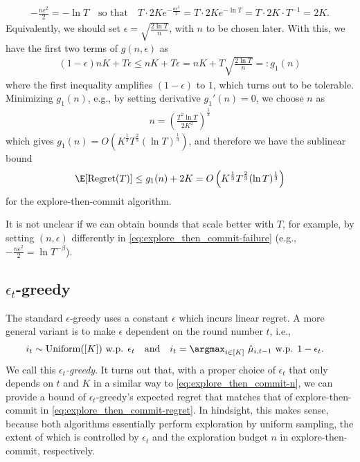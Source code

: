 \begin{align}
\label{eq:explore_then_commit-failure}
    -\tfrac{n \epsilon^2}{2} = -\ln T 
    \quad\text{so that}\quad T\cdot2K e^{-\frac{n \epsilon^2}{2}} = T\cdot2K e^{-\ln T} = T\cdot2K\cdot T^{-1} = 2K.
\end{align}
Equivalently, we should set $\epsilon=\sqrt{\tfrac{2\ln T}{n}}$, with $n$ to be chosen later.
With this, we have the first two terms of $g(n,\epsilon)$ as 
\begin{align*}
    (1-\epsilon)nK + T\epsilon \leq nK + T\epsilon = nK + T\sqrt{\tfrac{2\ln T}{n}} =: g_1(n)
\end{align*}
where the first inequality amplifies $(1-\epsilon)$ to $1$, which turns out to be tolerable.
Minimizing $g_1(n)$, e.g., by setting derivative $g_1'(n)=0$, we choose $n$ as 
\begin{align}
\label{eq:explore_then_commit-n}
    n=\left(\frac{T^2\ln T}{2K^2}\right)^{\frac{1}{3}}
\end{align}
which gives $g_1(n) = O\left(K^{\frac{1}{3}}T^{\frac{2}{3}}(\ln T)^{\frac{1}{3}}\right)$, and therefore we have the sublinear bound
\begin{align}
\label{eq:explore_then_commit-regret}
\E[\Regret(T)] \leq  g_1(n) + 2K = O\left(K^{\frac{1}{3}}T^{\frac{2}{3}}(\ln T)^{\frac{1}{3}}\right)
\end{align}
for the explore-then-commit algorithm.

It is not unclear if we can obtain bounds that scale better with $T$, for example, by setting  $(n,\epsilon)$ differently in \eqref{eq:explore_then_commit-failure} (e.g., $-\tfrac{n \epsilon^2}{2}=\ln{T^{-\beta}}$). 

\subsection{$\epsilon_t$-greedy}
The standard $\epsilon$-greedy uses a constant $\epsilon$ which incurs linear regret.
A more general variant is to make $\epsilon$ dependent on the round number $t$, i.e.,
\begin{align*}
    &i_t \sim {\rm Uniform}([K]) \text{ w.p. $\epsilon_t$} 
    \quad \text{and} \quad 
    i_t =\textstyle\argmax_{i\in[K]}~\hat{\mu}_{i,t-1} \text{ w.p. $1-\epsilon_t$}.
\end{align*}
We call this {\em $\epsilon_t$-greedy}. 
It turns out that, with a proper choice of $\epsilon_t$ that only depends on $t$ and $K$ in a similar way to \eqref{eq:explore_then_commit-n}, we can provide a bound of $\epsilon_t$-greedy's expected regret that matches that of explore-then-commit in \eqref{eq:explore_then_commit-regret}.
In hindsight, this makes sense, because both algorithms essentially perform exploration by uniform sampling, the extent of which is controlled by $\epsilon_t$ and the exploration budget $n$ in explore-then-commit, respectively.

